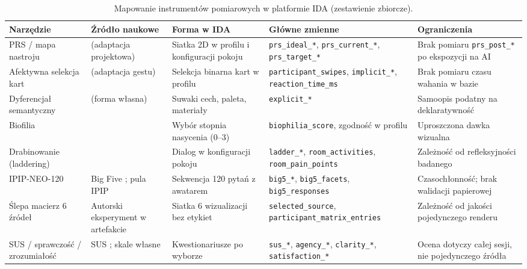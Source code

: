 \begin{table}[htbp]
  \centering
  \footnotesize
  \setlength{\tabcolsep}{3.5pt}
  \caption{Mapowanie instrumentów pomiarowych w platformie IDA (zestawienie zbiorcze).}
  \label{tab:ch06:instruments}
  \begin{tabular}{@{}>{\raggedright\arraybackslash}p{}>{\raggedright\arraybackslash}p{}>{\raggedright\arraybackslash}p{}>{\raggedright\arraybackslash}p{}>{\raggedright\arraybackslash}p{}@{}}
    \toprule
    Narzędzie & Źródło naukowe & Forma w IDA & Główne zmienne & Ograniczenia \\
    \midrule
    PRS / mapa nastroju &
    \textcite{hartig1997prs} (adaptacja projektowa) &
    Siatka 2D w profilu i konfiguracji pokoju &
    \texttt{prs\_ideal\_*}, \texttt{prs\_current\_*}, \texttt{prs\_target\_*} &
    Brak pomiaru \texttt{prs\_post\_*} po ekspozycji na AI \\
    \addlinespace
    Afektywna selekcja kart &
    \textcite{greenwald1998iat} (adaptacja gestu) &
    Selekcja binarna kart w profilu &
    \texttt{participant\_swipes}, \texttt{implicit\_*}, \texttt{reaction\_time\_ms} &
    Brak pomiaru czasu wahania w bazie \\
    \addlinespace
    Dyferencjał semantyczny &
    \textcite{osgood1957measurement} (forma własna) &
    Suwaki cech, paleta, materiały &
    \texttt{explicit\_*} &
    Samoopis podatny na deklaratywność \\
    \addlinespace
    Biofilia &
    \textcite{kellert2008biophilic} &
    Wybór stopnia nasycenia (0--3) &
    \texttt{biophilia\_score}, zgodność w profilu &
    Uproszczona dawka wizualna \\
    \addlinespace
    Drabinowanie (laddering) &
    \textcite{reynolds1988laddering} &
    Dialog w konfiguracji pokoju &
    \texttt{ladder\_*}, \texttt{room\_activities}, \texttt{room\_pain\_points} &
    Zależność od refleksyjności badanego \\
    \addlinespace
    IPIP-NEO-120 &
    Big Five \cite{john2008bigfive}; pula IPIP &
    Sekwencja 120 pytań z awatarem &
    \texttt{big5\_*}, \texttt{big5\_facets}, \texttt{big5\_responses} &
    Czasochłonność; brak walidacji papierowej \\
    \addlinespace
    Ślepa macierz 6 źródeł &
    Autorski eksperyment w artefakcie &
    Siatka 6 wizualizacji bez etykiet &
    \texttt{selected\_source}, \texttt{participant\_matrix\_entries} &
    Zależność od jakości pojedynczego renderu \\
    \addlinespace
    SUS / sprawczość / zrozumiałość &
    SUS \cite{brooke1996sus}; skale własne &
    Kwestionariusze po wyborze &
    \texttt{sus\_*}, \texttt{agency\_*}, \texttt{clarity\_*}, \texttt{satisfaction\_*} &
    Ocena dotyczy całej sesji, nie pojedynczego źródła \\
    \bottomrule
  \end{tabular}
\end{table}

